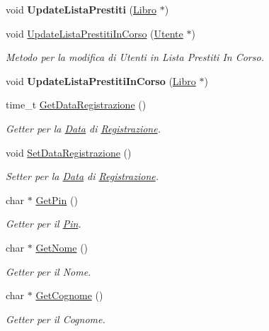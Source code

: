 \begin{DoxyCompactItemize}
\mbox{\label{class_persona_a163b75133201e6763d8dda84f9afa951}} 
void {\bfseries Update\+Lista\+Prestiti} (\mbox{\hyperlink{class_libro}{Libro}} $\ast$)
\item 
\mbox{\label{class_persona_a5320069309eb9aff6c5da358b0c930c5}} 
void \mbox{\hyperlink{class_persona_a5320069309eb9aff6c5da358b0c930c5}{Update\+Lista\+Prestiti\+In\+Corso}} (\mbox{\hyperlink{class_utente}{Utente}} $\ast$)
\begin{DoxyCompactList}\small\item\em Metodo per la modifica di Utenti in Lista Prestiti In Corso. \end{DoxyCompactList}\item 
\mbox{\label{class_persona_af08b858055be38620e154973efb215a0}} 
void {\bfseries Update\+Lista\+Prestiti\+In\+Corso} (\mbox{\hyperlink{class_libro}{Libro}} $\ast$)
\item 
time\+\_\+t \mbox{\hyperlink{class_persona_a93d0e678c65154a03f07b0e5b48d6f78}{Get\+Data\+Registrazione}} ()
\begin{DoxyCompactList}\small\item\em Getter per la \mbox{\hyperlink{class_data}{Data}} di \mbox{\hyperlink{class_registrazione}{Registrazione}}. \end{DoxyCompactList}\item 
\mbox{\label{class_persona_addab494a40e55af180c7b2e125bdc314}} 
void \mbox{\hyperlink{class_persona_addab494a40e55af180c7b2e125bdc314}{Set\+Data\+Registrazione}} ()
\begin{DoxyCompactList}\small\item\em Setter per la \mbox{\hyperlink{class_data}{Data}} di \mbox{\hyperlink{class_registrazione}{Registrazione}}. \end{DoxyCompactList}\item 
char $\ast$ \mbox{\hyperlink{class_persona_a840ce621ec4598d7c2c52cbfdf39764b}{Get\+Pin}} ()
\begin{DoxyCompactList}\small\item\em Getter per il \mbox{\hyperlink{class_pin}{Pin}}. \end{DoxyCompactList}\item 
char $\ast$ \mbox{\hyperlink{class_persona_a05788dcb627fed81b04c90a6b82121aa}{Get\+Nome}} ()
\begin{DoxyCompactList}\small\item\em Getter per il Nome. \end{DoxyCompactList}\item 
char $\ast$ \mbox{\hyperlink{class_persona_aac79de5438c101f8fa14a6c5011329b0}{Get\+Cognome}} ()
\begin{DoxyCompactList}\small\item\em Getter per il Cognome. \end{DoxyCompactList}\end{DoxyCompactItemize}


